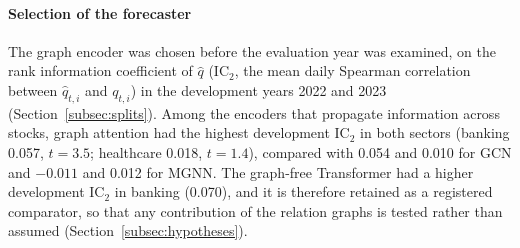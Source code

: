 \paragraph{Selection of the forecaster}
{\color{blue}The graph encoder was chosen before the evaluation year was examined, on the rank information coefficient of $\hat q$ (IC$_2$, the mean daily Spearman correlation between $\hat q_{t,i}$ and $q_{t,i}$) in the development years 2022 and 2023 (Section~\ref{subsec:splits}). Among the encoders that propagate information across stocks, graph attention had the highest development IC$_2$ in both sectors (banking 0.057, $t=3.5$; healthcare 0.018, $t=1.4$), compared with 0.054 and 0.010 for GCN and $-0.011$ and 0.012 for MGNN. The graph-free Transformer had a higher development IC$_2$ in banking (0.070), and it is therefore retained as a registered comparator, so that any contribution of the relation graphs is tested rather than assumed (Section~\ref{subsec:hypotheses}).\par}
